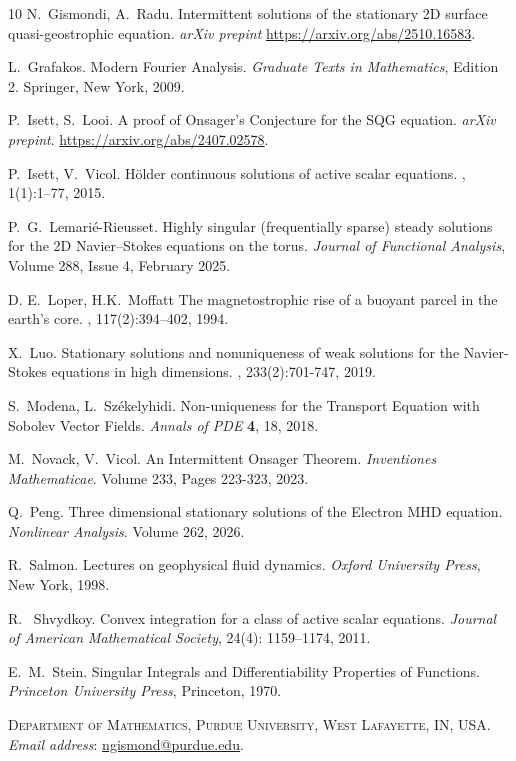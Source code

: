 \documentclass[12pt,reqno,letterpaper]{amsart}
\numberwithin{equation}{section}
\newcommand{\1}{{\bf 1}}
\newcommand{\2}{{\bf 2}}
\theoremstyle{remark}
\theoremstyle{remark}
\begin{document}
\begin{thebibliography}{10}
    N.~Gismondi, A.~Radu.
    \newblock Intermittent solutions of the stationary 2D surface quasi-geostrophic equation.
    \newblock \emph{arXiv prepint} \url{https://arxiv.org/abs/2510.16583}.

    L.~Grafakos.
    \newblock Modern Fourier Analysis.
    \newblock \emph{Graduate Texts in Mathematics}, Edition 2.  Springer, New York, 2009.

    P.~Isett, S.~Looi.
    \newblock A proof of Onsager's Conjecture for the SQG equation.
    \newblock \emph{arXiv prepint}.
    \url{https://arxiv.org/abs/2407.02578}.

    P.~Isett, V.~Vicol.
    \newblock  H\"{o}lder continuous solutions of active scalar equations.
    , 1(1):1--77, 2015.

    P.~G.~Lemarié-Rieusset.
    \newblock Highly singular (frequentially sparse) steady solutions for the 2D Navier–Stokes equations on the torus.  
    \newblock\emph{Journal of Functional Analysis}, Volume 288, Issue 4, February 2025.
    
    D. E.~Loper, H.K.~Moffatt
    \newblock The magnetostrophic rise of a buoyant parcel in the earth’s core.
    , 117(2):394–402, 1994.

    X.~Luo.
    \newblock Stationary solutions and nonuniqueness of weak solutions for the Navier-Stokes equations in high dimensions.
    , 233(2):701-747, 2019.

    S.~Modena, L.~Sz{{\'e}}kelyhidi.
    \newblock Non-uniqueness for the Transport Equation with Sobolev Vector Fields.
    \newblock \emph{Annals of PDE} \textbf{4}, 18, 2018.

    M.~Novack, V.~Vicol.
    \newblock An Intermittent Onsager Theorem.
    \newblock \emph{Inventiones Mathematicae}. Volume 233, Pages 223-323, 2023.

    Q.~Peng.
    \newblock Three dimensional stationary solutions of the Electron MHD equation.
    \newblock \emph{Nonlinear Analysis}. Volume 262, 2026.

    R.~Salmon.
    \newblock Lectures on geophysical fluid dynamics.
    \newblock \emph{Oxford University Press}, New York, 1998.

    R. ~Shvydkoy.
    \newblock Convex integration for a class of active scalar equations.
    \newblock \emph{Journal of American Mathematical Society},
    24(4): 1159--1174, 2011.

    E.~M.~Stein.
    \newblock Singular Integrals and Differentiability Properties of Functions.
    \newblock \emph{Princeton University Press}, Princeton, 1970.

    



\end{thebibliography}

\noindent\textsc{Department of Mathematics, Purdue University, West Lafayette, IN, USA.}
\vspace{.03in}
\newline\noindent\textit{Email address}: \href{mailto:ngismond@purdue.edu}{ngismond@purdue.edu}.
\end{document}
